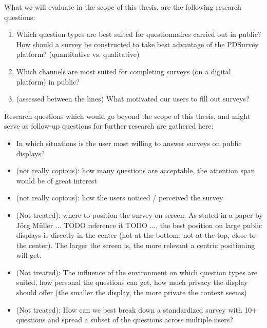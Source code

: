	What we will evaluate in the scope of this thesis, are the following research questions:

	\begin{enumerate}
	\item Which question types are best suited for questionnaires carried out in public? How should a survey be constructed to take best advantage of the PDSurvey platform? (quantitative vs. qualitative)

	\item Which channels are most suited for completing surveys (on a digital platform) in public?

	\item (assessed between the lines) What motivated our users to fill out surveys?
	\end{enumerate}


	Research questions which would go beyond the scope of this thesis, and might serve as follow-up questions for further research are gathered here:

	\begin{itemize}
	\item In which situations is the user most willing to answer surveys on public displays?
	\item (not really copious): how many questions are acceptable, the attention span would be of great interest
	\item (not really copious): how the users noticed / perceived the survey
	\item (Not treated): where to position the survey on screen. As stated in a paper by J\"org M\"uller ... TODO reference it TODO ..., the best position on large public displays is directly in the center (not at the bottom, not at the top, close to the center). The larger the screen is, the more relevant a centric positioning will get.
	\item (Not treated): The influence of the environment on which question types are suited, how personal the questions can get, how much privacy the display should offer (the smaller the display, the more private the context seems)
	\item (Not treated): How can we best break down a standardized survey with 10+ questions and spread a subset of the questions across multiple users?
	\end{itemize}

